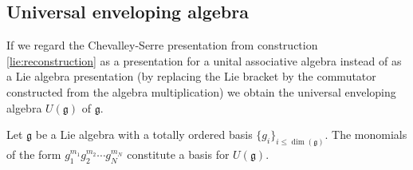 \subsection{Universal enveloping algebra}


    \begin{construct}\label{lie:uea_construct}
        If we regard the Chevalley-Serre presentation from construction \ref{lie:reconstruction} as a presentation for a unital associative algebra instead of as a Lie algebra presentation (by replacing the Lie bracket by the commutator constructed from the algebra multiplication) we obtain the universal enveloping algebra $U(\mathfrak{g})$ of $\mathfrak{g}$.
    \end{construct}

    \begin{theorem}
        Let $\mathfrak{g}$ be a Lie algebra with a totally ordered basis $\{g_i\}_{i\leq\dim(\mathfrak{g})}$. The monomials of the form $g_1^{m_1}g_2^{m_2}\cdots g_N^{m_N}$ constitute a basis for $U(\mathfrak{g})$.
    \end{theorem}

